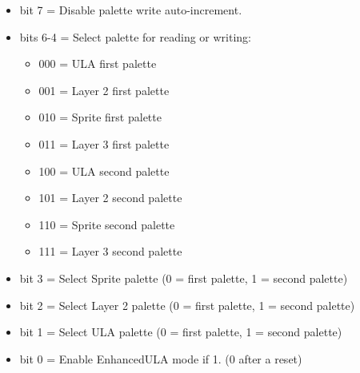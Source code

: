 \begin{itemize}
\item bit 7 = Disable palette write auto-increment.
\item bits 6-4 = Select palette for reading or writing:
  \begin{itemize}
  \item 000 = ULA first palette
  \item 001 = Layer 2 first palette
  \item 010 = Sprite first palette
  \item 011 = Layer 3 first palette
  \item 100 = ULA second palette
  \item 101 = Layer 2 second palette
  \item 110 = Sprite second palette
  \item 111 = Layer 3 second palette
  \end{itemize}
\item bit 3 = Select Sprite palette (0 = first palette, 1 = second
  palette)
\item bit 2 = Select Layer 2 palette (0 = first palette, 1 = second
  palette)
\item bit 1 = Select ULA palette (0 = first palette, 1 = second
  palette)
\item bit 0 = Enable EnhancedULA mode if 1. (0 after a reset)
\end{itemize}

